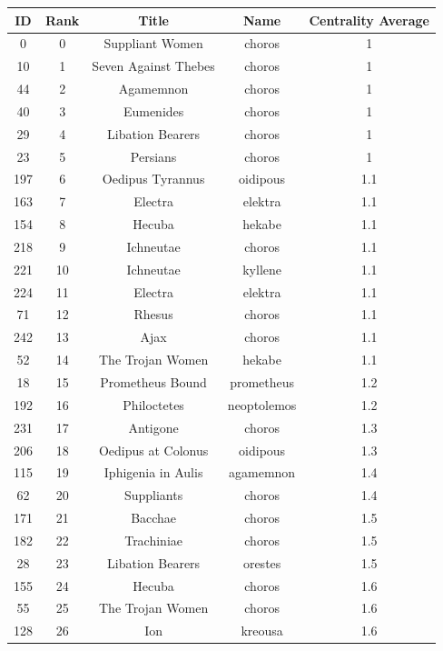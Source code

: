\documentclass{jcls}
\begin{document}
\begin{longtable}{|c|c|c|c|c|}
  \hline
  \textbf{ID} & \textbf{Rank} & \textbf{Title} & \textbf{Name} &
  \textbf{Centrality Average} \\
  \hline
  0 & 0 & Suppliant Women & choros & 1 \\ \hline
  10 & 1 & Seven Against Thebes & choros & 1 \\ \hline
  44 & 2 & Agamemnon & choros & 1 \\ \hline
  40 & 3 & Eumenides & choros & 1 \\ \hline
  29 & 4 & Libation Bearers & choros & 1 \\ \hline
  23 & 5 & Persians & choros & 1 \\ \hline
  197 & 6 & Oedipus Tyrannus & oidipous & 1.1 \\ \hline
  163 & 7 & Electra & elektra & 1.1 \\ \hline
  154 & 8 & Hecuba & hekabe & 1.1 \\ \hline
  218 & 9 & Ichneutae & choros & 1.1 \\ \hline
  221 & 10 & Ichneutae & kyllene & 1.1 \\ \hline
  224 & 11 & Electra & elektra & 1.1 \\ \hline
  71 & 12 & Rhesus & choros & 1.1 \\ \hline
  242 & 13 & Ajax & choros & 1.1 \\ \hline
  52 & 14 & The Trojan Women & hekabe & 1.1 \\ \hline
  18 & 15 & Prometheus Bound & prometheus & 1.2 \\ \hline
  192 & 16 & Philoctetes & neoptolemos & 1.2 \\ \hline
  231 & 17 & Antigone & choros & 1.3 \\ \hline
  206 & 18 & Oedipus at Colonus & oidipous & 1.3 \\ \hline
  115 & 19 & Iphigenia in Aulis & agamemnon & 1.4 \\ \hline
  62 & 20 & Suppliants & choros & 1.4 \\ \hline
  171 & 21 & Bacchae & choros & 1.5 \\ \hline
  182 & 22 & Trachiniae & choros & 1.5 \\ \hline
  28 & 23 & Libation Bearers & orestes & 1.5 \\ \hline
  155 & 24 & Hecuba & choros & 1.6 \\ \hline
  55 & 25 & The Trojan Women & choros & 1.6 \\ \hline
  128 & 26 & Ion & kreousa & 1.6 \\ \hline

\end{longtable}
\end{document}
